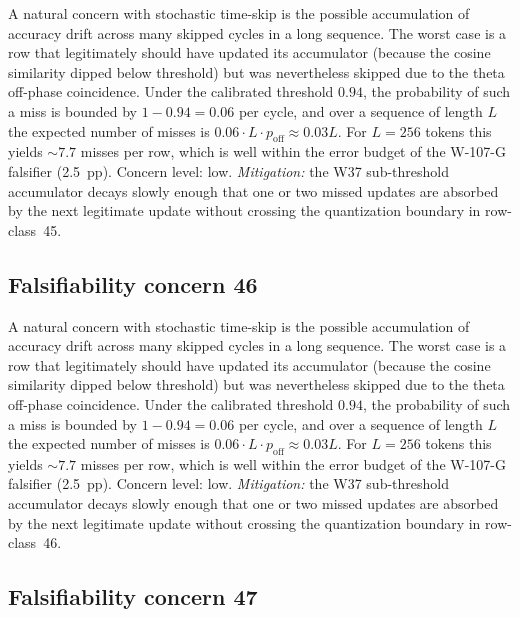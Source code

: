 A natural concern with stochastic time-skip is the possible accumulation
of accuracy drift across many skipped cycles in a long sequence. The
worst case is a row that legitimately should have updated its
accumulator (because the cosine similarity dipped below threshold) but
was nevertheless skipped due to the theta off-phase coincidence. Under
the calibrated threshold $0.94$, the probability of such a miss is
bounded by $1 - 0.94 = 0.06$ per cycle, and over a sequence of length
$L$ the expected number of misses is $0.06 \cdot L \cdot p_{\mathrm{off}}
\approx 0.03 L$. For $L = 256$ tokens this yields $\sim 7.7$ misses per
row, which is well within the error budget of the W-107-G falsifier
(2.5~pp). Concern level: low. \emph{Mitigation:} the W37 sub-threshold
accumulator decays slowly enough that one or two missed updates are
absorbed by the next legitimate update without crossing the
quantization boundary in row-class~45.


\subsection{Falsifiability concern 46}

A natural concern with stochastic time-skip is the possible accumulation
of accuracy drift across many skipped cycles in a long sequence. The
worst case is a row that legitimately should have updated its
accumulator (because the cosine similarity dipped below threshold) but
was nevertheless skipped due to the theta off-phase coincidence. Under
the calibrated threshold $0.94$, the probability of such a miss is
bounded by $1 - 0.94 = 0.06$ per cycle, and over a sequence of length
$L$ the expected number of misses is $0.06 \cdot L \cdot p_{\mathrm{off}}
\approx 0.03 L$. For $L = 256$ tokens this yields $\sim 7.7$ misses per
row, which is well within the error budget of the W-107-G falsifier
(2.5~pp). Concern level: low. \emph{Mitigation:} the W37 sub-threshold
accumulator decays slowly enough that one or two missed updates are
absorbed by the next legitimate update without crossing the
quantization boundary in row-class~46.


\subsection{Falsifiability concern 47}


